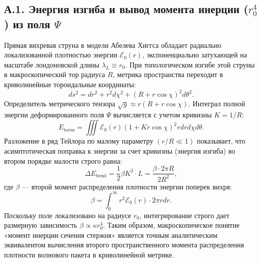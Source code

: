 \documentclass[12pt,a4paper]{article}
\begin{document}
\subsection*{А.1. Энергия изгиба и вывод момента инерции ($r_0^4$) из поля $\Psi$}
Прямая вихревая струна в модели Абелева Хиггса обладает радиально локализованной плотностью энергии $\mathcal{E}_0(r)$, экспоненциально затухающей на масштабе лондоновской длины $\lambda_L \equiv r_0$. При топологическом изгибе этой струны в макроскопический тор радиуса $R$, метрика пространства переходит в криволинейные тороидальные координаты:
\begin{equation}
ds^2 = dr^2 + r^2 d\chi^2 + (R + r\cos\chi)^2 d\theta^2.
\end{equation}
Определитель метрического тензора $\sqrt{g} \approx r(R + r\cos\chi)$. Интеграл полной энергии деформированного поля $\Psi$ вычисляется с учетом кривизны $K = 1/R$:
\begin{equation}
E_{\text{torus}} = \iiint \mathcal{E}_0(r) \left(1 + K r\cos\chi\right)^2 r dr d\chi d\theta.
\end{equation}
Разложение в ряд Тейлора по малому параметру $(r/R \ll 1)$ показывает, что асимптотическая поправка к энергии за счет кривизны (энергия изгиба) во втором порядке малости строго равна:
\begin{equation}
\Delta E_{\text{bend}} = \frac{1}{2} \beta K^2 \cdot L = \frac{\beta \cdot 2\pi R}{2 R^2},
\end{equation}
где $\beta$ — второй момент распределения плотности энергии поперек вихря:
\begin{equation}
\beta = \int_0^\infty r^2 \mathcal{E}_0(r) \cdot 2\pi r dr.
\end{equation}
Поскольку поле локализовано на радиусе $r_0$, интегрирование строго дает размерную зависимость $\beta \propto \kappa r_0^4$. Таким образом, макроскопическое понятие «момент инерции сечения стержня» является точным аналитическим эквивалентом вычисления второго пространственного момента распределения плотности волнового пакета в криволинейной метрике.
\end{document}
